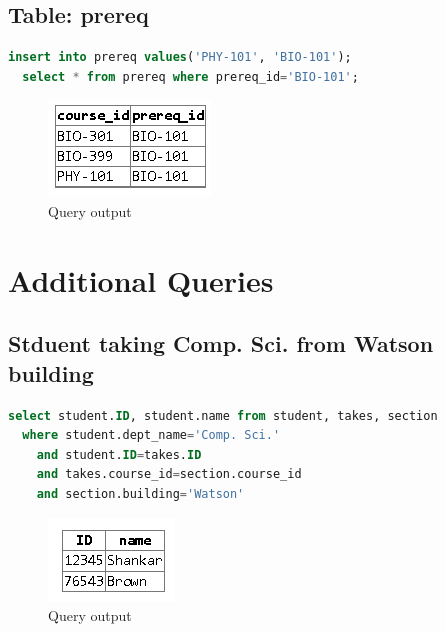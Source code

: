 \documentclass{article}
\begin{document}
\subsection{Table: prereq}
\begin{lstlisting}[language=sql]
  insert into prereq values('PHY-101', 'BIO-101');
  select * from prereq where prereq_id='BIO-101';
\end{lstlisting}
\begin{figure}[!ht]
  \begin{center}
  \includegraphics[scale=1]{ew.png}
  \caption{Query output}
  \end{center}
\end{figure}

\newpage
\section{Additional Queries}
\subsection{Stduent taking Comp. Sci. from Watson building}
\begin{lstlisting}[language=sql]
  select student.ID, student.name from student, takes, section 
  where student.dept_name='Comp. Sci.' 
    and student.ID=takes.ID 
    and takes.course_id=section.course_id 
    and section.building='Watson'
\end{lstlisting}
\begin{figure}[!ht]
  \begin{center}
  \includegraphics[scale=1]{4_a.png}
  \caption{Query output}
  \end{center}
\end{figure}
\end{document}
